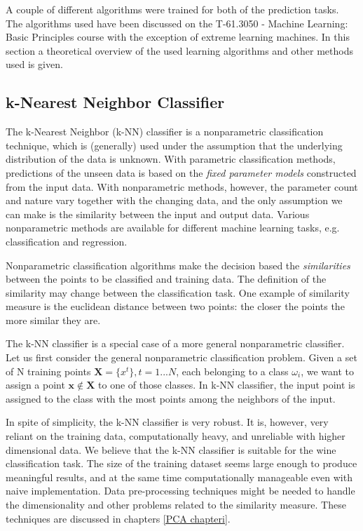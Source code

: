 A couple of different algorithms were trained for both of the prediction tasks. The algorithms used have been discussed on the T-61.3050 - Machine Learning: Basic Principles course with the exception of extreme learning machines. In this section a theoretical overview of the used learning algorithms and other methods used is given.

\subsection{k-Nearest Neighbor Classifier}
The k-Nearest Neighbor (k-NN) classifier is a nonparametric classification technique, which is (generally) used under the assumption that the underlying distribution of the data is unknown. With parametric classification methods, predictions of the unseen data is based on the \emph{fixed parameter models} constructed from the input data. With nonparametric methods, however, the parameter count and nature vary together with the changing data, and the only assumption we can make is the similarity between the input and output data. Various nonparametric methods are available for different machine learning tasks, e.g. classification and regression. \cite{alpaydin:2004:introduction} %

Nonparametric classification algorithms make the decision based the \emph{similarities} between the points to be classified and training data. The definition of the similarity may change between the classification task. One example of similarity measure is the euclidean distance between two points: the closer the points the more similar they are.

The k-NN classifier is a special case of a more general nonparametric classifier. Let us first consider the general nonparametric classification problem. Given a set of N training points  $\mathbf{X} = \{x^{t}\}, t=1...N$, each belonging to a class $\omega_{i}$, we want to assign a point $\mathbf{x} \notin \mathbf{X}$ to one of those classes. In k-NN classifier, the input point is assigned to the class with the most points among the neighbors of the input.

In spite of simplicity, the k-NN classifier is very robust. It is, however, very reliant on the
training data, computationally heavy, and unreliable with higher dimensional data. We believe that the k-NN classifier is suitable for the wine classification task. The size of the training dataset seems large enough to produce meaningful results, and at the same time computationally manageable even with naive implementation. Data pre-processing techniques might be needed to handle the dimensionality and other problems related to the similarity measure. These techniques are discussed in chapters \ref{PCA chapteri}.

